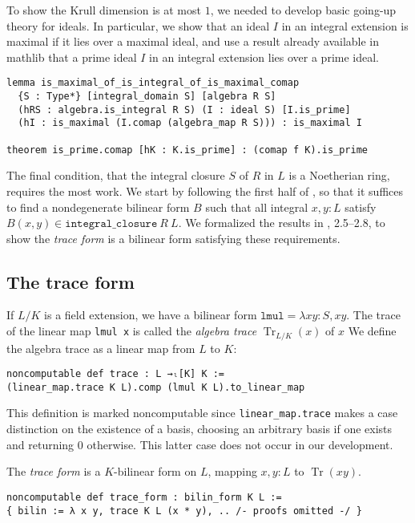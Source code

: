 \documentclass[a4paper,USenglish,cleveref, autoref, thm-restate]{lipics-v2021}
\newcommand{\lean}[1]{\texttt{#1}\xspace} %
\DeclareMathOperator{\Tr}{Tr}
\newcommand{\mathlib}{\textsf{mathlib}\xspace}
\begin{document}
To show the Krull dimension is at most $1$, we needed to develop basic going-up theory for ideals.
In particular, we show that an ideal $I$ in an integral extension is maximal if it lies over a maximal ideal,
and use a result already available in \mathlib that a prime ideal $I$ in an integral extension lies over a prime ideal.
\begin{lstlisting}
lemma is_maximal_of_is_integral_of_is_maximal_comap
  {S : Type*} [integral_domain S] [algebra R S]
  (hRS : algebra.is_integral R S) (I : ideal S) [I.is_prime]
  (hI : is_maximal (I.comap (algebra_map R S))) : is_maximal I

theorem is_prime.comap [hK : K.is_prime] : (comap f K).is_prime
\end{lstlisting}

The final condition, that the integral closure $S$ of $R$ in $L$ is a Noetherian ring, requires the most work.
We start by following the first half of \cite[Theorem 15.29]{Dummit-and-Foote},
so that it suffices to find a nondegenerate bilinear form $B$ such that all integral $x, y : L$ satisfy $B(x, y) \in \lean{integral\_closure}\ R\ L$.
We formalized the results in \cite{Neukirch}, 2.5--2.8, to show the \emph{trace form} is a bilinear form satisfying these requirements.

\subsection{The trace form}\label{sec:trace-form}
If $L / K$ is a field extension, we have a bilinear form $\lean{lmul} = \lambda x y : S, xy$.
The trace of the linear map \lean{lmul x} is called the \emph{algebra trace} $\Tr_{L / K}(x)$ of $x$
We define the algebra trace as a linear map from $L$ to $K$:
\begin{lstlisting}
noncomputable def trace : L →ₗ[K] K :=
(linear_map.trace K L).comp (lmul K L).to_linear_map
\end{lstlisting}
This definition is marked noncomputable since \lean{linear\_map.trace} makes a case distinction on the existence of a basis,
choosing an arbitrary basis if one exists and returning $0$ otherwise.
This latter case does not occur in our development.

The \emph{trace form} is a $K$-bilinear form on $L$, mapping $x, y : L$ to $\Tr(xy)$.
\begin{lstlisting}
noncomputable def trace_form : bilin_form K L :=
{ bilin := λ x y, trace K L (x * y), .. /- proofs omitted -/ }
\end{lstlisting}
\end{document}
